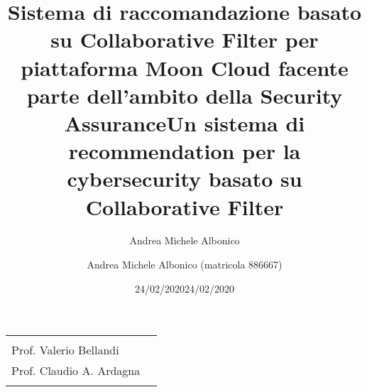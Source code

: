\documentclass[10pt,a4paper]{article}
\title{Sistema di raccomandazione basato su Collaborative Filter per piattaforma Moon Cloud 
facente parte dell'ambito della Security Assurance}
\author{Andrea Michele Albonico}
\date{24/02/2020}
\begin{document}
\title{\textbf{Un sistema di recommendation per la cybersecurity basato su Collaborative Filter}}
\author{Andrea Michele Albonico (matricola 886667)}
\date{24/02/2020}

\maketitle

\vspace{0.5 cm}

\begin{minipage}{\linewidth}
    \begin{tabular}{l r}
        \begin{minipage}[t]{.4\linewidth}
            \begin{flushleft}
                {
                    RELATORE\\[.15cm]
                    Prof. Valerio Bellandi
                }
            \end{flushleft}
        \end{minipage}
        &
        \begin{minipage}[t]{.53\linewidth}
            \begin{flushright}
                {
                    CORRELATORE\\[.15cm]
                    Prof. Claudio A. Ardagna\\[.1cm]
                }
            \end{flushright}
        \end{minipage}
    \end{tabular}
\end{minipage}

\vspace{2 cm}
\end{document}
